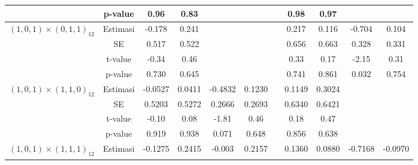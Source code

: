 \begin{enumerate}[label=\alph*.]
\begin{longtable}{|c|c|c|c|c|c|c|c|c|c|c|}
            & p-value
            & {0.96} & {0.83}
            & {} & {} & {}
            & {0.98} & {0.97}
            & {} & {} \\ \hline

            \multirow{4}{*}{$(1,0,1)\times(0,1,1)_{12}$}
            & Estimasi
            & {-0.178} & {0.241}
            & {} & {} & {}
            & {0.217} & {0.116}
            & {-0.704} & {0.104} \\ \cline{2-11}

            & SE
            & {0.517} & {0.522}
            & {} & {} & {}
            & {0.656} & {0.663}
            & {0.328} & {0.331} \\ \cline{2-11}

            & t-value
            & {-0.34} & {0.46}
            & {} & {} & {}
            & {0.33} & {0.17}
            & {-2.15} & {0.31} \\ \cline{2-11}

            & p-value
            & {0.730} & {0.645}
            & {} & {} & {}
            & {0.741} & {0.861}
            & {0.032} & {0.754} \\ \hline

            \multirow{4}{*}{$(1,0,1)\times(1,1,0)_{12}$}
            & Estimasi
            & {-0.0527} & {0.0411}
            & {-0.4832} & {0.1230} & {}
            & {0.1149} & {0.3024}
            & {} & {} \\ \cline{2-11}

            & SE
            & {0.5203} & {0.5272}
            & {0.2666} & {0.2693} & {}
            & {0.6340} & {0.6421}
            & {} & {} \\ \cline{2-11}

            & t-value
            & {-0.10} & {0.08}
            & {-1.81} & {0.46} & {}
            & {0.18} & {0.47}
            & {} & {} \\ \cline{2-11}

            & p-value
            & {0.919} & {0.938}
            & {0.071} & {0.648} & {}
            & {0.856} & {0.638}
            & {} & {} \\ \hline

            \multirow{4}{*}{$(1,0,1)\times(1,1,1)_{12}$}
            & Estimasi
            & {-0.1275} & {0.2415}
            & {-0.003} & {0.2157} & {}
            & {0.1360} & {0.0880}
            & {-0.7168} & {-0.0970} \\ \cline{2-11}


\end{longtable}
\end{enumerate}
